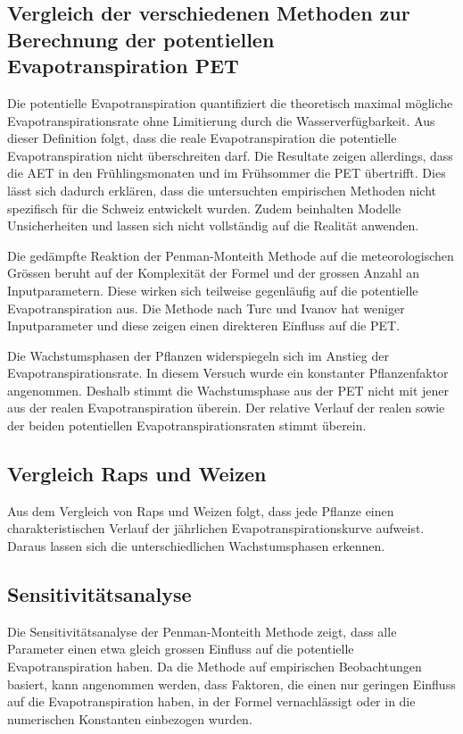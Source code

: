\subsection{Vergleich der verschiedenen Methoden zur Berechnung der potentiellen Evapotranspiration PET}

Die potentielle Evapotranspiration quantifiziert die theoretisch maximal mögliche Evapotranspirationsrate ohne Limitierung durch die Wasserverfügbarkeit. Aus dieser Definition folgt, dass die reale Evapotranspiration die potentielle Evapotranspiration nicht überschreiten darf. Die Resultate zeigen allerdings, dass die AET in den Frühlingsmonaten und im Frühsommer die PET übertrifft. Dies lässt sich dadurch erklären, dass die untersuchten empirischen Methoden nicht spezifisch für die Schweiz entwickelt wurden. Zudem beinhalten Modelle Unsicherheiten und lassen sich nicht vollständig auf die Realität anwenden.

Die gedämpfte Reaktion der Penman-Monteith Methode auf die meteorologischen Grössen beruht auf der Komplexität der Formel und der grossen Anzahl an Inputparametern. Diese wirken sich teilweise gegenläufig auf die potentielle Evapotranspiration aus. Die Methode nach Turc und Ivanov hat weniger Inputparameter und diese zeigen einen direkteren Einfluss auf die PET.

Die Wachstumsphasen der Pflanzen widerspiegeln sich im Anstieg der Evapotranspirationsrate. In diesem Versuch wurde ein konstanter Pflanzenfaktor angenommen. Deshalb stimmt die Wachstumsphase aus der PET nicht mit jener aus der realen Evapotranspiration überein. Der relative Verlauf der realen sowie der beiden potentiellen Evapotranspirationsraten stimmt überein.

\subsection{Vergleich Raps und Weizen}
Aus dem Vergleich von Raps und Weizen folgt, dass jede Pflanze einen charakteristischen Verlauf der jährlichen Evapotranspirationskurve aufweist. Daraus lassen sich die unterschiedlichen Wachstumsphasen erkennen.

\subsection{Sensitivitätsanalyse}
Die Sensitivitätsanalyse der Penman-Monteith Methode zeigt, dass alle Parameter einen etwa gleich grossen Einfluss auf die potentielle Evapotranspiration haben. Da die Methode auf empirischen Beobachtungen basiert, kann angenommen werden, dass Faktoren, die einen nur geringen Einfluss auf die Evapotranspiration haben, in der Formel vernachlässigt oder in die numerischen Konstanten einbezogen wurden.

